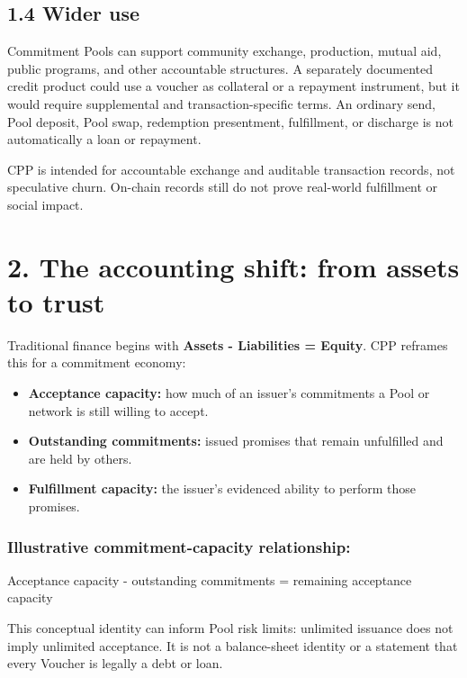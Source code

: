 \documentclass[11pt]{article}
\begin{document}
\subsection*{1.4 Wider use}

Commitment Pools can support community exchange, production, mutual aid, public programs, and other accountable structures. A separately documented credit product could use a voucher as collateral or a repayment instrument, but it would require supplemental and transaction-specific terms. An ordinary send, Pool deposit, Pool swap, redemption presentment, fulfillment, or discharge is not automatically a loan or repayment.

CPP is intended for accountable exchange and auditable transaction records, not speculative churn. On-chain records still do not prove real-world fulfillment or social impact.


\section*{2. The accounting shift: from assets to trust}

Traditional finance begins with \textbf{Assets - Liabilities = Equity}. CPP reframes this for a commitment economy:

\begin{itemize}[leftmargin=*]
\item \textbf{Acceptance capacity:} how much of an issuer's commitments a Pool or network is still willing to accept.
\item \textbf{Outstanding commitments:} issued promises that remain unfulfilled and are held by others.
\item \textbf{Fulfillment capacity:} the issuer's evidenced ability to perform those promises.
\end{itemize}
\subsubsection*{Illustrative commitment-capacity relationship:}

Acceptance capacity - outstanding commitments = remaining acceptance capacity

This conceptual identity can inform Pool risk limits: unlimited issuance does not imply unlimited acceptance. It is not a balance-sheet identity or a statement that every Voucher is legally a debt or loan.
\end{document}
